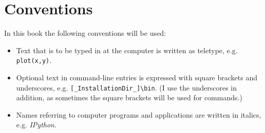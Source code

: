\section{Conventions}

In this book the following conventions will be used:
\begin{itemize}
  \item Text that is to be typed in at the computer is written as teletype, e.g. \lstinline{plot(x,y)}.
  \item Optional text in command-line entries is expressed with square brackets and underscores, e.g. \lstinline{[_InstallationDir_]\bin}. (I use the underscores in addition, as sometimes the square brackets will be used for commands.)
  \item Names referring to computer programs and applications are written in italics, e.g. \emph{IPython}.

\end{itemize}

